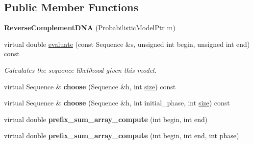 \subsection*{Public Member Functions}
\begin{DoxyCompactItemize}
\item 
\mbox{\label{classtops_1_1ReverseComplementDNA_a78b2444c57a748d4f2de751273d4e29a}} 
{\bfseries Reverse\+Complement\+D\+NA} (Probabilistic\+Model\+Ptr m)
\item 
\mbox{\label{classtops_1_1ReverseComplementDNA_a4c47cfd5eb20136e28f6c4e35058c232}} 
virtual double \hyperlink{classtops_1_1ReverseComplementDNA_a4c47cfd5eb20136e28f6c4e35058c232}{evaluate} (const Sequence \&s, unsigned int begin, unsigned int end) const
\begin{DoxyCompactList}\small\item\em Calculates the sequence likelihood given this model. \end{DoxyCompactList}\item 
\mbox{\label{classtops_1_1ReverseComplementDNA_aef1fdda4f4a1ea54074e7f511189f7e9}} 
virtual Sequence \& {\bfseries choose} (Sequence \&h, int \hyperlink{classtops_1_1ProbabilisticModel_a4e3910e9b9b848b7078e7101909ae82a}{size}) const
\item 
\mbox{\label{classtops_1_1ReverseComplementDNA_af0ff0ad907991f79d6ddef44f559fb6a}} 
virtual Sequence \& {\bfseries choose} (Sequence \&h, int initial\+\_\+phase, int \hyperlink{classtops_1_1ProbabilisticModel_a4e3910e9b9b848b7078e7101909ae82a}{size}) const
\item 
\mbox{\label{classtops_1_1ReverseComplementDNA_ac90377926e5e1f942aa637d9f67d09cc}} 
virtual double {\bfseries prefix\+\_\+sum\+\_\+array\+\_\+compute} (int begin, int end)
\item 
\mbox{\label{classtops_1_1ReverseComplementDNA_a8f3787e2f25643ab512572732adcd6f5}} 
virtual double {\bfseries prefix\+\_\+sum\+\_\+array\+\_\+compute} (int begin, int end, int phase)
\item 
\mbox{\label{classtops_1_1ReverseComplementDNA_a81021fb49341e0b2d61c6b974462b44f}} 

\end{DoxyCompactItemize}
